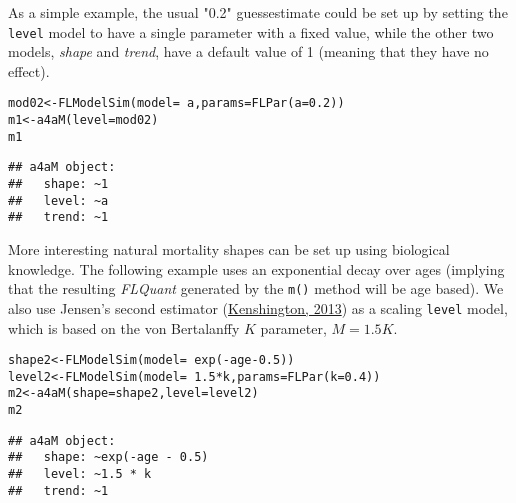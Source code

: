 \documentclass[a4paper,english,10pt]{article}\usepackage[]{graphicx}\usepackage[]{color}
\makeatletter
\newcommand{\hlnum}[1]{\textcolor[rgb]{0.2,0.2,0.2}{#1}}%
\newcommand{\hlopt}[1]{\textcolor[rgb]{0.2,0.2,0.2}{#1}}%
\newcommand{\hlstd}[1]{\textcolor[rgb]{0,0,0}{#1}}%
\newcommand{\hlkwb}[1]{\textcolor[rgb]{0.361,0.506,0.596}{#1}}%
\newcommand{\hlkwc}[1]{\textcolor[rgb]{0.361,0.506,0.596}{#1}}%
\newcommand{\hlkwd}[1]{\textcolor[rgb]{0.361,0.506,0.596}{#1}}%
\newenvironment{kframe}{%
 \def\at@end@of@kframe{}%
 \ifinner\ifhmode%
  \def\at@end@of@kframe{\end{minipage}}%
  \begin{minipage}{\columnwidth}%
 \fi\fi%
 \def\FrameCommand##1{\hskip\@totalleftmargin \hskip-\fboxsep
 \colorbox{shadecolor}{##1}\hskip-\fboxsep
     \hskip-\linewidth \hskip-\@totalleftmargin \hskip\columnwidth}%
 \MakeFramed {\advance\hsize-\width
   \@totalleftmargin\z@ \linewidth\hsize
   \@setminipage}}%
 {\par\unskip\endMakeFramed%
 \at@end@of@kframe}
\newenvironment{knitrout}{}{} %
\newcommand{\code}[1]{{\texttt{#1}}}
\newcommand{\class}[1]{{\textit{#1}}}
\makeatother
\begin{document}
As a simple example, the usual "0.2" guessestimate could be set up by setting the \code{level} model to have a single parameter with a fixed value, while the other two models, \class{shape} and \class{trend}, have a default value of 1 (meaning that they have no effect).

\begin{knitrout}
\color{fgcolor}\begin{kframe}
\begin{alltt}
\hlstd{mod02} \hlkwb{<-} \hlkwd{FLModelSim}\hlstd{(}\hlkwc{model}\hlstd{=}\hlopt{~}\hlstd{a,} \hlkwc{params}\hlstd{=}\hlkwd{FLPar}\hlstd{(}\hlkwc{a}\hlstd{=}\hlnum{0.2}\hlstd{))}
\hlstd{m1} \hlkwb{<-} \hlkwd{a4aM}\hlstd{(}\hlkwc{level}\hlstd{=mod02)}
\hlstd{m1}
\end{alltt}
\begin{verbatim}
## a4aM object:
##   shape: ~1
##   level: ~a
##   trend: ~1
\end{verbatim}
\end{kframe}
\end{knitrout}

More interesting natural mortality shapes can be set up using biological knowledge. The following example uses an exponential decay over ages (implying that the resulting \class{FLQuant} generated by the \code{m()} method will be age based). We also use Jensen's second estimator (\href{}{Kenshington, 2013}) as a scaling \code{level} model, which is based on the von Bertalanffy $K$ parameter, $M=1.5K$. 

\begin{knitrout}
\color{fgcolor}\begin{kframe}
\begin{alltt}
\hlstd{shape2} \hlkwb{<-} \hlkwd{FLModelSim}\hlstd{(}\hlkwc{model}\hlstd{=}\hlopt{~}\hlkwd{exp}\hlstd{(}\hlopt{-}\hlstd{age}\hlopt{-}\hlnum{0.5}\hlstd{))}
\hlstd{level2} \hlkwb{<-} \hlkwd{FLModelSim}\hlstd{(}\hlkwc{model}\hlstd{=}\hlopt{~}\hlnum{1.5}\hlopt{*}\hlstd{k,} \hlkwc{params}\hlstd{=}\hlkwd{FLPar}\hlstd{(}\hlkwc{k}\hlstd{=}\hlnum{0.4}\hlstd{))}
\hlstd{m2} \hlkwb{<-} \hlkwd{a4aM}\hlstd{(}\hlkwc{shape}\hlstd{=shape2,} \hlkwc{level}\hlstd{=level2)}
\hlstd{m2}
\end{alltt}
\begin{verbatim}
## a4aM object:
##   shape: ~exp(-age - 0.5)
##   level: ~1.5 * k
##   trend: ~1
\end{verbatim}
\end{kframe}
\end{knitrout}
\end{document}
